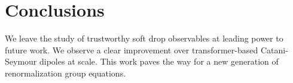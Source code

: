 \section{Conclusions}\label{sec:conclusions}

We leave the study of trustworthy soft drop observables at leading power
to future work. We observe a clear improvement over transformer-based
Catani-Seymour dipoles at scale. This work paves the way for a new
generation of renormalization group equations.

